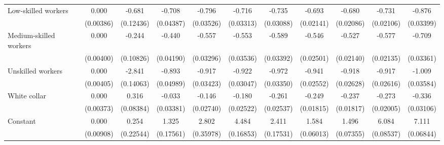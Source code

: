 {\begin{tabular}{l*{10}{c}}
Low-skilled workers &       0.000         &      -0.681\sym{***}&      -0.708\sym{***}&      -0.796\sym{***}&      -0.716\sym{***}&      -0.735\sym{***}&      -0.693\sym{***}&      -0.680\sym{***}&      -0.731\sym{***}&      -0.876\sym{***}\\
                    &   (0.00386)         &   (0.12436)         &   (0.04387)         &   (0.03526)         &   (0.03313)         &   (0.03088)         &   (0.02141)         &   (0.02086)         &   (0.02106)         &   (0.03399)         \\
Medium-skilled workers&       0.000         &      -0.244\sym{*}  &      -0.440\sym{***}&      -0.557\sym{***}&      -0.553\sym{***}&      -0.589\sym{***}&      -0.546\sym{***}&      -0.527\sym{***}&      -0.577\sym{***}&      -0.709\sym{***}\\
                    &   (0.00400)         &   (0.10826)         &   (0.04190)         &   (0.03296)         &   (0.03536)         &   (0.03392)         &   (0.02501)         &   (0.02140)         &   (0.02135)         &   (0.03361)         \\
Unskilled workers   &       0.000         &      -2.841\sym{***}&      -0.893\sym{***}&      -0.917\sym{***}&      -0.922\sym{***}&      -0.972\sym{***}&      -0.941\sym{***}&      -0.918\sym{***}&      -0.917\sym{***}&      -1.009\sym{***}\\
                    &   (0.00405)         &   (0.14063)         &   (0.04989)         &   (0.03423)         &   (0.03047)         &   (0.03350)         &   (0.02552)         &   (0.02628)         &   (0.02616)         &   (0.03584)         \\
White collar        &       0.000         &       0.316\sym{***}&      -0.033         &      -0.146\sym{***}&      -0.180\sym{***}&      -0.261\sym{***}&      -0.249\sym{***}&      -0.237\sym{***}&      -0.273\sym{***}&      -0.336\sym{***}\\
                    &   (0.00373)         &   (0.08384)         &   (0.03381)         &   (0.02740)         &   (0.02522)         &   (0.02537)         &   (0.01815)         &   (0.01817)         &   (0.02005)         &   (0.03106)         \\
Constant            &       0.000         &       0.254         &       1.325\sym{***}&       2.802\sym{***}&       4.484\sym{***}&       2.411\sym{***}&       1.584\sym{***}&       1.496\sym{***}&       6.084\sym{***}&       7.111\sym{***}\\
                    &   (0.00908)         &   (0.22544)         &   (0.17561)         &   (0.35978)         &   (0.16853)         &   (0.17531)         &   (0.06013)         &   (0.07355)         &   (0.08537)         &   (0.06844)         \\

\end{tabular}}
